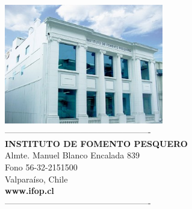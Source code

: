 \documentclass[12pt, oneside]{article} %
\begin{document}
\begin{titlepage}


\normalsize
\vspace*{13cm} 

\noindent

 \begin{minipage}{\textwidth}
  \parbox[t]{1.2\linewidth}{
 \begin{flushright}
            \centering
\includegraphics[height=5.2cm]{Figuras/Portada1_Final.jpg} \\
 ----------------------------------------------------\\
 \fontsize{11pt}{10pt}\selectfont 	
 \textbf{INSTITUTO DE FOMENTO PESQUERO} \\
 Almte. Manuel Blanco Encalada 839 \\ 
 Fono 56-32-2151500 \\
 Valparaíso, Chile \\
\textbf{www.ifop.cl} \\
 ----------------------------------------------------\\
\end{flushright} 
}
 \end{minipage}


\vfill
\end{titlepage}

\end{document}
